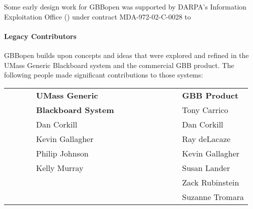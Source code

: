 Some early design work for GBBopen was supported by DARPA's Information
Exploitation Office () under
contract MDA-972-02-C-0028 to 

\paragraph{Legacy  Contributors}

GBBopen builds upon concepts and ideas that were explored and refined in the
UMass Generic Blackboard system and the commercial GBB product.  The following
people made significant contributions to those systems:

\begin{tabular}{llll}
  ~~~~~& \textbf{UMass Generic} & ~~~~~~~~~~~~~ & \textbf{GBB Product}\\
  & \textbf{Blackboard System} & & Tony Carrico \\  
  & Dan Corkill & & Dan Corkill \\
  & Kevin Gallagher & & Ray deLacaze\\
  & Philip Johnson & & Kevin Gallagher\\
  & Kelly Murray & & Susan Lander \\
  & & & Zack Rubinstein\\
  & & & Suzanne Tromara\\
\end{tabular}

